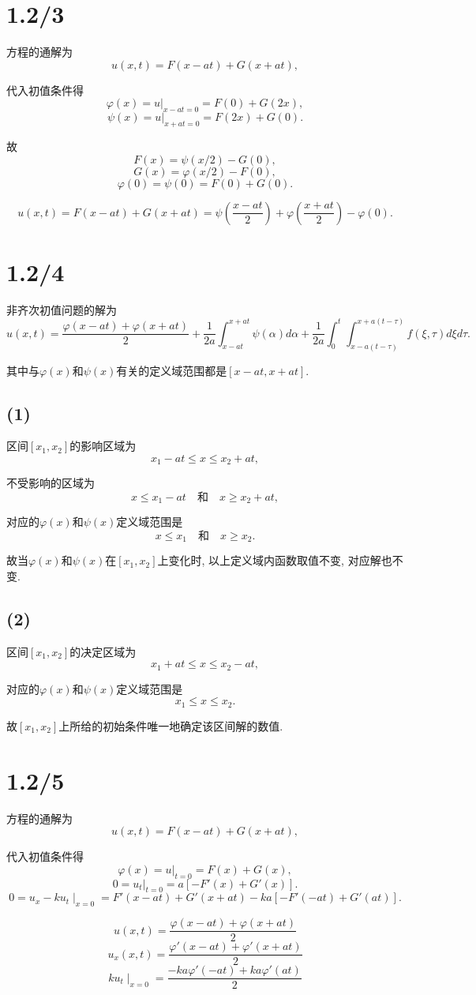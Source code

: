 \documentclass[11pt,a4paper]{article}
\author{刘逸灏 (515370910207)}
\begin{document}
\maketitle

\section{1.2/3}

方程的通解为
$$u(x,t)=F(x-at)+G(x+at),$$

代入初值条件得
$$\varphi(x)=u|_{x-at=0}=F(0)+G(2x),$$
$$\psi(x)=u|_{x+at=0}=F(2x)+G(0).$$

故
$$F(x)=\psi(x/2)-G(0),$$
$$G(x)=\varphi(x/2)-F(0),$$
$$\varphi(0)=\psi(0)=F(0)+G(0).$$

$$u(x,t)=F(x-at)+G(x+at)=\psi\left(\frac{x-at}{2}\right)+\varphi\left(\frac{x+at}{2}\right)-\varphi(0).$$

\section{1.2/4}

非齐次初值问题的解为
$$u(x,t)=\frac{\varphi(x-at)+\varphi(x+at)}{2}+\frac{1}{2a}\int_{x-at}^{x+at}\psi(\alpha)d\alpha+\frac{1}{2a}\int_0^t\int_{x-a(t-\tau)}^{x+a(t-\tau)}f(\xi,\tau)d\xi d\tau.$$

其中与$\varphi(x)$和$\psi(x)$有关的定义域范围都是$[x-at,x+at]$.

\subsection*{(1)}
区间$[x_1,x_2]$的影响区域为$$x_1-at\leqslant x\leqslant x_2+at,$$

不受影响的区域为$$x\leqslant x_1-at\quad\text{和}\quad x\geqslant x_2+at,$$

对应的$\varphi(x)$和$\psi(x)$定义域范围是$$x\leqslant x_1\quad\text{和}\quad x\geqslant x_2.$$

故当$\varphi(x)$和$\psi(x)$在$[x_1,x_2]$上变化时, 以上定义域内函数取值不变, 对应解也不变.

\subsection*{(2)}

区间$[x_1,x_2]$的决定区域为$$x_1+at\leqslant x\leqslant x_2-at,$$

对应的$\varphi(x)$和$\psi(x)$定义域范围是$$x_1\leqslant x\leqslant x_2.$$

故$[x_1,x_2]$上所给的初始条件唯一地确定该区间解的数值.

\section{1.2/5}
方程的通解为
$$u(x,t)=F(x-at)+G(x+at),$$

代入初值条件得
$$\varphi(x)=u|_{t=0}=F(x)+G(x),$$
$$0=u_t|_{t=0}=a[-F'(x)+G'(x)].$$
$$0=u_x-ku_t\mid_{x=0}=F'(x-at)+G'(x+at)-ka[-F'(-at)+G'(at)].$$

$$u(x,t)=\frac{\varphi(x-at)+\varphi(x+at)}{2}$$
$$u_x(x,t)=\frac{\varphi'(x-at)+\varphi'(x+at)}{2}$$
$$ku_t\mid_{x=0}=\frac{-ka\varphi'(-at)+ka\varphi'(at)}{2}$$
\end{document}

